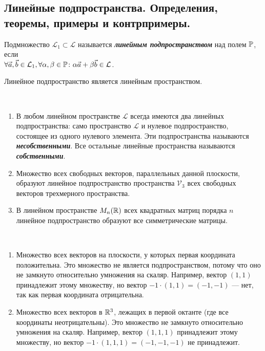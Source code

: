 \subsection{
    Линейные подпространства. Определения, теоремы, примеры и контрпримеры.
}

\begin{definition}
    Подмножество $\mathcal{L}_1 \subset \mathcal{L}$ называется \textbf{\textit{линейным подпространством}} над полем $\mathbb{P}$, если \\ $\forall \vec{a}, \vec{b} \in \mathcal{L}_1, \forall \alpha, \beta \in \mathbb{P} \colon \alpha \vec{a} + \beta \vec{b} \in \mathcal{L}$.
\end{definition}

\begin{theorem}
    Линейное подпространство является линейным пространством.
\end{theorem}

\begin{example}~

    \begin{enumerate}
        \item В любом линейном пространстве $\mathcal{L}$ всегда имеются два линейных подпространства: само пространство $\mathcal{L}$ и нулевое подпространство, состоящее из одного нулевого элемента. Эти подпространства называются \textbf{\textit{несобственными}}. Все остальные линейные пространства называются \textbf{\textit{собственными}}.
        \item Множество всех свободных векторов, параллельных данной плоскости, образуют линейное подпространство пространства $\mathcal{V}_3$ всех свободных векторов трехмерного пространства.
        \item В линейном пространстве $M_n(\mathbb{R})$ всех квадратных матриц порядка $n$ линейное подпространство образуют все симметрические матрицы.
    \end{enumerate}
\end{example}

\begin{counterexample}~

    \begin{enumerate}
        \item Множество всех векторов на плоскости, у которых первая координата положительна. Это множество не является подпространством, потому что оно не замкнуто относительно умножения на скаляр. Например, вектор $(1, 1)$ принадлежит этому множеству, но вектор $-1 \cdot (1, 1) = (-1, -1)$ — нет, так как первая координата отрицательна.
        \item Множество всех векторов в $\mathbb{R}^3$, лежащих в первой октанте (где все координаты неотрицательны). Это множество не замкнуто относительно умножения на скаляр. Например, вектор $(1, 1, 1)$ принадлежит этому множеству, но вектор $-1 \cdot (1, 1, 1) = (-1, -1, -1)$ не принадлежит.
    \end{enumerate}
\end{counterexample}
